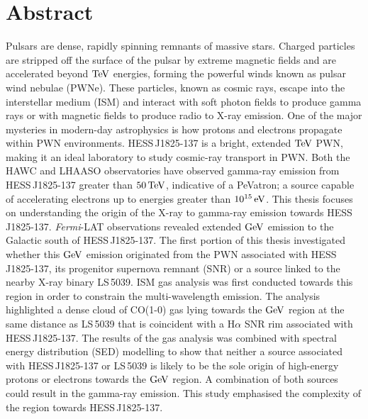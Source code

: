 \chapter{Abstract}
Pulsars are dense, rapidly spinning remnants of massive stars. Charged particles are stripped off the surface of the pulsar by extreme magnetic fields and are accelerated beyond $\TeV$ energies, forming the powerful winds known as pulsar wind nebulae (PWNe). These particles, known as cosmic rays, escape into the interstellar medium (ISM) and interact with soft photon fields to produce gamma rays or with magnetic fields to produce radio to X-ray emission. One of the major mysteries in modern-day astrophysics is how protons and electrons propagate within PWN environments.
\newpar
\mbox{HESS\,J1825-137} is a bright, extended $\TeV$ PWN, making it an ideal laboratory to study cosmic-ray transport in PWN. Both the HAWC and LHAASO observatories have observed gamma-ray emission from \mbox{HESS\,J1825-137} greater than $50\,\TeV$, indicative of a PeVatron; a source capable of accelerating electrons up to energies greater than $10^{15}\,\si{\electronvolt}$. This thesis focuses on understanding the origin of the X-ray to gamma-ray emission towards \mbox{HESS\,J1825-137}.
\newpar
\textit{Fermi}-LAT observations revealed extended $\si{\giga\electronvolt}$ emission to the Galactic south of \mbox{HESS\,J1825-137}. The first portion of this thesis investigated whether this $\si{\giga\electronvolt}$ emission originated from the PWN associated with \mbox{HESS\,J1825-137}, its progenitor supernova remnant (SNR) or a source linked to the nearby X-ray binary \mbox{LS\,5039}. ISM gas analysis was first conducted towards this region in order to constrain the multi-wavelength emission. The analysis highlighted a dense cloud of CO(1-0) gas lying towards the $\si{\giga\electronvolt}$ region at the same distance as \mbox{LS\,5039} that is coincident with a H$\alpha$ SNR rim associated with \mbox{HESS\,J1825-137}. The results of the gas analysis was combined with spectral energy distribution (SED) modelling to show that neither a source associated with \mbox{HESS\,J1825-137} or \mbox{LS\,5039} is likely to be the sole origin of high-energy protons or electrons towards the $\si{\giga\electronvolt}$ region. A combination of both sources could result in the gamma-ray emission. This study emphasised the complexity of the region towards \mbox{HESS\,J1825-137}.
\newpar
